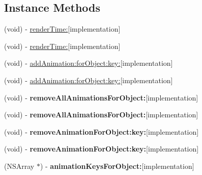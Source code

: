 \subsection*{Instance Methods}
\begin{DoxyCompactItemize}
\item 
(void) -\/ \mbox{\hyperlink{interface_p_o_p_animator_a6824004e158ffe4729b2a45da5f087cb}{render\+Time\+:}}{\ttfamily  \mbox{[}implementation\mbox{]}}
\item 
(void) -\/ \mbox{\hyperlink{interface_p_o_p_animator_a6824004e158ffe4729b2a45da5f087cb}{render\+Time\+:}}{\ttfamily  \mbox{[}implementation\mbox{]}}
\item 
(void) -\/ \mbox{\hyperlink{interface_p_o_p_animator_acb57d2ae51f4732276306c0923139edb}{add\+Animation\+:for\+Object\+:key\+:}}{\ttfamily  \mbox{[}implementation\mbox{]}}
\item 
(void) -\/ \mbox{\hyperlink{interface_p_o_p_animator_acb57d2ae51f4732276306c0923139edb}{add\+Animation\+:for\+Object\+:key\+:}}{\ttfamily  \mbox{[}implementation\mbox{]}}
\item 
\mbox{\label{interface_p_o_p_animator_a9a6bd6ed28fd33e039ee427aec11e747}} 
(void) -\/ {\bfseries remove\+All\+Animations\+For\+Object\+:}{\ttfamily  \mbox{[}implementation\mbox{]}}
\item 
\mbox{\label{interface_p_o_p_animator_a9a6bd6ed28fd33e039ee427aec11e747}} 
(void) -\/ {\bfseries remove\+All\+Animations\+For\+Object\+:}{\ttfamily  \mbox{[}implementation\mbox{]}}
\item 
\mbox{\label{interface_p_o_p_animator_a907461e6a71300f2eb52fe2a2262f5d2}} 
(void) -\/ {\bfseries remove\+Animation\+For\+Object\+:key\+:}{\ttfamily  \mbox{[}implementation\mbox{]}}
\item 
\mbox{\label{interface_p_o_p_animator_a907461e6a71300f2eb52fe2a2262f5d2}} 
(void) -\/ {\bfseries remove\+Animation\+For\+Object\+:key\+:}{\ttfamily  \mbox{[}implementation\mbox{]}}
\item 
\mbox{\label{interface_p_o_p_animator_a384e31ee7f7810f678e4868932ea5c60}} 
(N\+S\+Array $\ast$) -\/ {\bfseries animation\+Keys\+For\+Object\+:}{\ttfamily  \mbox{[}implementation\mbox{]}}
\item 

\end{DoxyCompactItemize}
